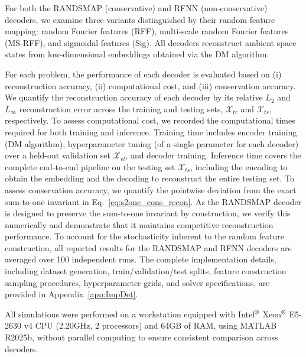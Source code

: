 \documentclass{article}
\begin{document}
For both the RANDSMAP (conservative) and RFNN (non-conservative) decoders, we examine three variants distinguished by their random feature mapping: random Fourier features (RFF), multi‑scale random Fourier features (MS‑RFF), and sigmoidal features (Sig). All decoders reconstruct ambient space states from low‑dimensional embeddings obtained via the DM algorithm. 

For each problem, the performance of each decoder is evaluated based on (i) reconstruction accuracy, (ii) computational cost, and (iii) conservation accuracy. We quantify the reconstruction accuracy of each decoder by its relative $L_2$ and $L_\infty$ reconstruction error across the training and testing sets, $\mathcal{X}_{tr}$ and $\mathcal{X}_{ts}$, respectively. To assess computational cost, we recorded the computational times required for both training and inference. Training time includes encoder training (DM algorithm), hyperparameter tuning (of a single parameter for each decoder) over a held-out validation set $\mathcal{X}_{vl}$, and decoder training. Inference time covers the complete end-to-end pipeline on the testing set $\mathcal{X}_{ts}$, including the encoding to obtain the embedding and the decoding to reconstruct the entire testing set. To assess conservation accuracy, we quantify the pointwise deviation from the exact sum-to-one invariant in Eq.~\eqref{eq:s2one_cons_recon}. As the RANDSMAP decoder is designed to preserve the sum-to-one invariant by construction, we verify this numerically and demonstrate that it maintains competitive reconstruction performance. To account for the stochasticity inherent to the random feature construction, all reported results for the RANDSMAP and RFNN decoders are averaged over 100 independent runs. The complete implementation details, including dataset generation, train/validation/test splits, feature construction sampling procedures, hyperparameter grids, and solver specifications, are provided in Appendix~\ref{app:ImpDet}.

All simulations were performed on a workstation equipped with Intel$^{\text{\textregistered}}$ Xeon$^{\text{\textregistered}}$ E5-2630 v4 CPU (2.20GHz, 2 processors) and 64GB of RAM, using MATLAB R2025b, without parallel computing to ensure consistent comparison across decoders. 
\end{document}
